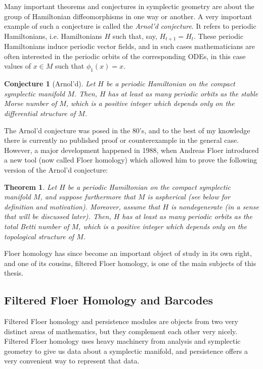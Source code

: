 \documentclass[11pt, a4paper]{article}
\newtheorem{theorem}{Theorem}
\newtheorem{conjecture}{Conjecture}
\theoremstyle{nonumberplain}
\begin{document}
Many important theorems and conjectures in symplectic geometry are about the group of Hamiltonian diffeomorphisms in one way or another. A very important example of such a conjecture is called the \emph{Arnol'd conjecture}. It refers to periodic Hamiltonians, i.e. Hamiltonians $H$ such that, say, $H_{t+1} = H_t$. These periodic Hamiltonians induce periodic vector fields, and in such cases mathematicians are often interested in the periodic orbits of the corresponding ODEs, in this case values of $x \in M$ such that $\phi_1(x) = x$.

\begin{conjecture}[Arnol'd]
Let $H$ be a periodic Hamiltonian on the compact symplectic manifold $M$. Then, $H$ has at least as many periodic orbits as the stable Morse number of $M$, which is a positive integer which depends only on the differential structure of $M$.
\end{conjecture}

The Arnol'd conjecture was posed in the 80's, and to the best of my knowledge there is currently no published proof or counterexample in the general case. However, a major development happened in 1988, when Andreas Floer introduced a new tool (now called Floer homology) which allowed him to prove the following version of the Arnol'd conjecture:
\begin{theorem}
Let $H$ be a periodic Hamiltonian on the compact symplectic manifold $M$, and suppose furthermore that $M$ is aspherical (see below for definition and motivation). Moreover, assume that $H$ is nondegenerate (in a sense that will be discussed later). Then, $H$ has at least as many periodic orbits as the total Betti number of $M$, which is a positive integer which depends only on the topological structure of $M$.
\end{theorem}

Floer homology has since become an important object of study in its own right, and one of its cousins, filtered Floer homology, is one of the main subjects of this thesis.

\subsection{Filtered Floer Homology and Barcodes}

Filtered Floer homology and persistence modules are objects from two very distinct areas of mathematics, but they complement each other very nicely. Filtered Floer homology uses heavy machinery from analysis and symplectic geometry to give us data about a symplectic manifold, and persistence offers a very convenient way to represent that data.
\end{document}
